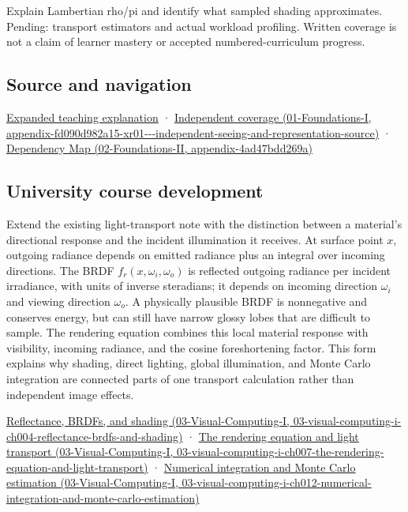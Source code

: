 Explain Lambertian rho/pi and identify what sampled shading approximates. Pending: transport estimators and actual workload profiling. Written coverage is not a claim of learner mastery or accepted numbered-curriculum progress.

\subsection{Source and navigation}\label{appendix-96da0b153b77-source-and-navigation}

\href{Continuous\%20Notes/University\%20-\%20Worlds,\%20Images\%20and\%20Inference\%20-\%20Graphics,\%20Vision\%20and\%20Photography\#Materials\%20turn\%20incoming\%20light\%20into\%20outgoing\%20light}{Expanded teaching explanation} · \href{../01-Foundations-I/main.pdf\#nameddest=appendix-fd090d982a15-xr01---independent-seeing-and-representation-source}{Independent coverage (01-Foundations-I, appendix-fd090d982a15-xr01-\/-\/-independent-seeing-and-representation-source)} · \href{../02-Foundations-II/main.pdf\#nameddest=appendix-4ad47bdd269a}{Dependency Map (02-Foundations-II, appendix-4ad47bdd269a)}

\subsection{University course development}\label{appendix-96da0b153b77-university-course-development}

Extend the existing light-transport note with the distinction between a material's directional response and the incident illumination it receives. At surface point \(x\), outgoing radiance depends on emitted radiance plus an integral over incoming directions. The BRDF \(f_r(x,\omega_i,\omega_o)\) is reflected outgoing radiance per incident irradiance, with units of inverse steradians; it depends on incoming direction \(\omega_i\) and viewing direction \(\omega_o\). A physically plausible BRDF is nonnegative and conserves energy, but can still have narrow glossy lobes that are difficult to sample. The rendering equation combines this local material response with visibility, incoming radiance, and the cosine foreshortening factor. This form explains why shading, direct lighting, global illumination, and Monte Carlo integration are connected parts of one transport calculation rather than independent image effects.

\href{../03-Visual-Computing-I/main.pdf\#nameddest=03-visual-computing-i-ch004-reflectance-brdfs-and-shading}{Reflectance, BRDFs, and shading (03-Visual-Computing-I, 03-visual-computing-i-ch004-reflectance-brdfs-and-shading)} · \href{../03-Visual-Computing-I/main.pdf\#nameddest=03-visual-computing-i-ch007-the-rendering-equation-and-light-transport}{The rendering equation and light transport (03-Visual-Computing-I, 03-visual-computing-i-ch007-the-rendering-equation-and-light-transport)} · \href{../03-Visual-Computing-I/main.pdf\#nameddest=03-visual-computing-i-ch012-numerical-integration-and-monte-carlo-estimation}{Numerical integration and Monte Carlo estimation (03-Visual-Computing-I, 03-visual-computing-i-ch012-numerical-integration-and-monte-carlo-estimation)}
